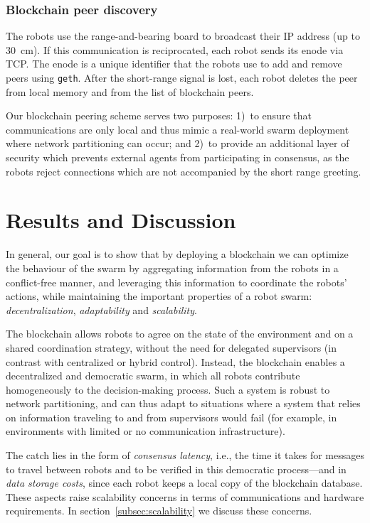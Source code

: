 \documentclass[runningheads]{llncs}
\newcommand{\rab}{range-and-bearing\xspace}
\begin{document}
\subsubsection{Blockchain peer discovery}
\label{sec:peer-discovery}
The robots use the \rab board to broadcast their IP address (up to $30$~cm). If this communication is reciprocated, each robot sends its enode via TCP. The enode is a unique identifier that the robots use to add and remove peers using \texttt{geth}. After the short-range signal is lost, each robot deletes the peer from local memory and from the list of blockchain peers. 

Our blockchain peering scheme serves two purposes: 1)~to ensure that communications are only local and thus mimic a real-world swarm deployment where network partitioning can occur; and 2)~to provide an additional layer of security which prevents external agents from participating in consensus, as the robots reject connections which are not accompanied by the short range greeting.

\section{Results and Discussion}
\label{sec:results-and-discussion}

In general, our goal is to show that by deploying a blockchain we can optimize the behaviour of the swarm by aggregating information from the robots in a conflict-free manner, and leveraging this information to coordinate the robots' actions, while maintaining the important properties of a robot swarm: \emph{decentralization}, \emph{adaptability} and \emph{scalability}.

The blockchain allows robots to agree on the state of the environment and on a shared coordination strategy, without the need for delegated supervisors (in contrast with centralized or hybrid control). Instead, the blockchain enables a decentralized and democratic swarm, in which all robots contribute homogeneously to the decision-making process. Such a system is robust to network partitioning, and can thus adapt to situations where a system that relies on information traveling to and from supervisors would fail (for example, in environments with limited or no communication infrastructure). 

The catch lies in the form of \emph{consensus latency}, i.e., the time it takes for messages to travel between robots and to be verified in this democratic process---and in \emph{data storage costs}, since each robot keeps a local copy of the blockchain database. These aspects raise scalability concerns in terms of communications and hardware requirements. In section~\ref{subsec:scalability} we discuss these concerns.
\end{document}
